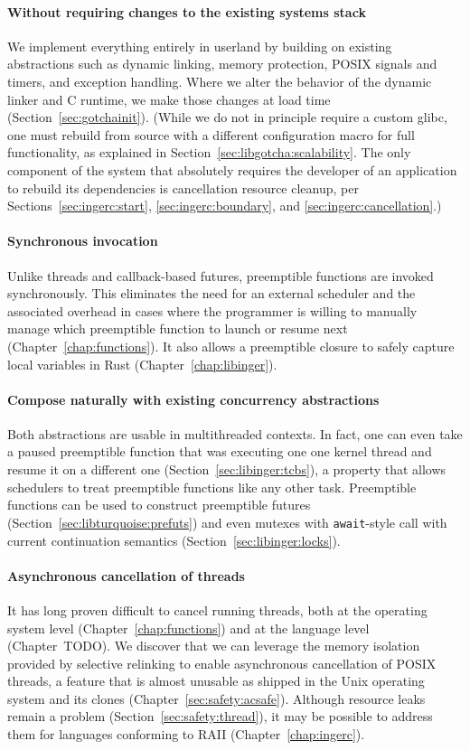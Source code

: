 \paragraph{Without requiring changes to the existing systems stack}
We implement everything entirely in userland by building on existing abstractions
such as dynamic linking, memory protection, POSIX signals and timers, and exception
handling.  Where we alter the behavior of the dynamic linker and C runtime, we make
those changes at load time (Section~\ref{sec:gotchainit}).  (While we do not in
principle require a custom glibc, one must rebuild from source with a different
configuration macro for full functionality, as explained in
Section~\ref{sec:libgotcha:scalability}.  The only component of the system that
absolutely requires the developer of an application to rebuild its dependencies is
cancellation resource cleanup, per Sections~\ref{sec:ingerc:start},
\ref{sec:ingerc:boundary}, and \ref{sec:ingerc:cancellation}.)

\paragraph{Synchronous invocation}
Unlike threads and callback-based futures, preemptible functions are invoked
synchronously.  This eliminates the need for an external scheduler and the associated
overhead in cases where the programmer is willing to manually manage which
preemptible function to launch or resume next (Chapter~\ref{chap:functions}).  It
also allows a preemptible closure to safely capture local variables in Rust
(Chapter~\ref{chap:libinger}).

\paragraph{Compose naturally with existing concurrency abstractions}
Both abstractions are usable in multithreaded contexts.  In fact, one can even take a
paused preemptible function that was executing one one kernel thread and resume it
on a different one (Section~\ref{sec:libinger:tcbs}), a property that allows
schedulers to treat preemptible functions like any other task.  Preemptible functions
can be used to construct preemptible futures (Section~\ref{sec:libturquoise:prefuts})
and even mutexes with \texttt{await}-style call with current continuation semantics
(Section~\ref{sec:libinger:locks}).

\paragraph{Asynchronous cancellation of threads}
It has long proven difficult to cancel running threads, both at the operating system
level (Chapter~\ref{chap:functions}) and at the language level (Chapter~TODO).  We
discover that we can leverage the memory isolation provided by selective relinking to
enable asynchronous cancellation of POSIX threads, a feature that is almost unusable
as shipped in the Unix operating system and its clones
(Chapter~\ref{sec:safety:acsafe}).  Although resource leaks remain a problem
(Section~\ref{sec:safety:thread}), it may be possible to address them for languages
conforming to RAII (Chapter~\ref{chap:ingerc}).

